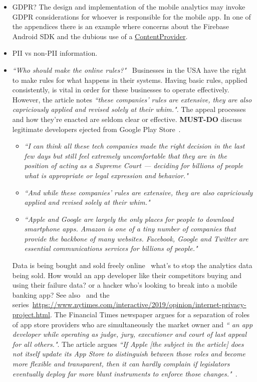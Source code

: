 \begin{itemize}
    \item GDPR? The design and implementation of the mobile analytics may invoke GDPR considerations for whoever is responsible for the mobile app. In one of the appendices there is an example where concerns about the Firebase Android SDK and the dubious use of a \href{Firebase-SDK-ContentProvider}{ContentProvider}.
    \item PII vs non-PII information.
    \item \emph{``Who should make the online rules?"}~\citep{nytimes20210111_who_should_make_the_online_rules} Businesses in the USA have the right to make rules for what happens in their systems. Having basic rules, applied consistently, is vital in order for these businesses to operate effectively. However, the article notes \emph{``these companies’ rules are extensive, they are also capriciously applied and revised solely at their whim."}. The appeal processes and how they're enacted are seldom clear or effective. \textbf{MUST-DO} discuss legitimate developers ejected from Google Play Store~\citep{mark_dodson_medium_story, Martinez_2019}. %
    \begin{itemize}
        \item \emph{``I can think all these tech companies made the right decision in the last few days but still feel extremely uncomfortable that they are in the position of acting as a Supreme Court — deciding for billions of people what is appropriate or legal expression and behavior."}
        \item \emph{``And while these companies’ rules are extensive, they are also capriciously applied and revised solely at their whim."}
        \item \emph{``Apple and Google are largely the only places for people to download smartphone apps. Amazon is one of a tiny number of companies that provide the backbone of many websites. Facebook, Google and Twitter are essential communications services for billions of people."}
    \end{itemize}
    Data is being bought and sold freely online~\citep{nytimes20210721_the_nightmare_of_our_snooping_phones} what's to stop the analytics data being sold. How would an app developer like their competitors buying and using their failure data? or a hacker who's looking to break into a mobile banking app? See also~\citep{nytimes20191221_total_surveillance_is_not_what_america_signed_up_for} and the series~\url{https://www.nytimes.com/interactive/2019/opinion/internet-privacy-project.html}. The Financial Times newspaper argues for a separation of roles of app store providers who are simultaneously the market owner and \emph{`` an app developer while operating as judge, jury, executioner and court of last appeal for all others."}. The article argues \emph{``If Apple [the subject in the article] does not itself update its App Store to distinguish between those roles and become more flexible and transparent, then it can hardly complain if legislators eventually deploy far more blunt instruments to enforce those changes."}~\citep{ft2020_apple_risks_losing_an_epic_challenge}.

\end{itemize}
